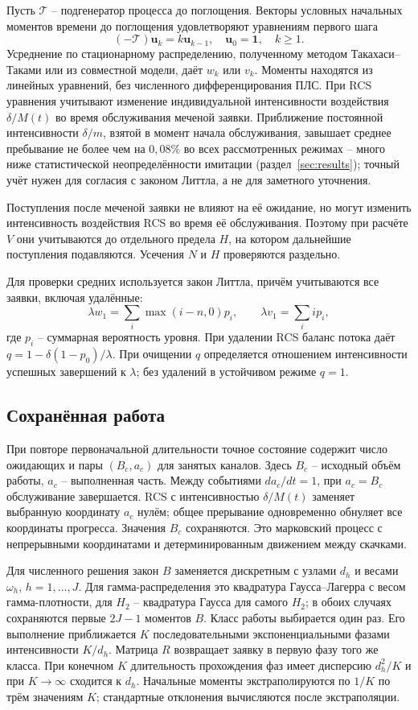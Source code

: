 Пусть \(\mathcal T\) -- подгенератор процесса до поглощения. Векторы условных начальных моментов времени до поглощения удовлетворяют уравнениям первого шага
\[
(-\mathcal T)\boldsymbol u_k=k\boldsymbol u_{k-1},\quad
\boldsymbol u_0=\mathbf1,\quad k\ge1.
\]
Усреднение по стационарному распределению, полученному методом Такахаси--Таками или из совместной модели, даёт \(w_k\) или \(v_k\). Моменты находятся из линейных уравнений, без численного дифференцирования ПЛС. При RCS уравнения учитывают изменение индивидуальной интенсивности воздействия \(\delta/M(t)\) во время обслуживания меченой заявки. Приближение постоянной интенсивности \(\delta/m\), взятой в момент начала обслуживания, завышает среднее пребывание не более чем на \(0{,}08\%\) во всех рассмотренных режимах -- много ниже статистической неопределённости имитации (раздел~\ref{sec:results}); точный учёт нужен для согласия с законом Литтла, а не для заметного уточнения.

Поступления после меченой заявки не влияют на её ожидание, но могут изменить интенсивность воздействия RCS во время её обслуживания. Поэтому при расчёте \(V\) они учитываются до отдельного предела \(H\), на котором дальнейшие поступления подавляются. Усечения \(N\) и \(H\) проверяются раздельно.

Для проверки средних используется закон Литтла, причём учитываются все заявки, включая удалённые:
\[
\lambda w_1=\sum_i\max(i-n,0)p_i,\qquad
\lambda v_1=\sum_i i p_i,
\]
где \(p_i\) -- суммарная вероятность уровня. При удалении RCS баланс потока даёт \(q=1-\delta(1-p_0)/\lambda\). При очищении \(q\) определяется отношением интенсивности успешных завершений к \(\lambda\); без удалений в устойчивом режиме \(q=1\).

\subsection{Сохранённая работа}
При повторе первоначальной длительности точное состояние содержит число ожидающих и пары \((B_c,a_c)\) для занятых каналов. Здесь \(B_c\) -- исходный объём работы, \(a_c\) -- выполненная часть. Между событиями \(da_c/dt=1\), при \(a_c=B_c\) обслуживание завершается. RCS с интенсивностью \(\delta/M(t)\) заменяет выбранную координату \(a_c\) нулём; общее прерывание одновременно обнуляет все координаты прогресса. Значения \(B_c\) сохраняются. Это марковский процесс с непрерывными координатами и детерминированным движением между скачками.

Для численного решения закон \(B\) заменяется дискретным с узлами \(d_h\) и весами \(\omega_h\), \(h=1,\ldots,J\). Для гамма-распределения это квадратура Гаусса--Лагерра с весом гамма-плотности, для \(H_2\) -- квадратура Гаусса для самого \(H_2\); в обоих случаях сохраняются первые \(2J-1\) моментов \(B\). Класс работы выбирается один раз. Его выполнение приближается \(K\) последовательными экспоненциальными фазами интенсивности \(K/d_h\). Матрица \(R\) возвращает заявку в первую фазу того же класса. При конечном \(K\) длительность прохождения фаз имеет дисперсию \(d_h^2/K\) и при \(K\to\infty\) сходится к \(d_h\). Начальные моменты экстраполируются по \(1/K\) по трём значениям \(K\); стандартные отклонения вычисляются после экстраполяции.


